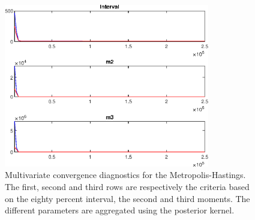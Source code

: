  
\begin{figure}[H]
\centering 
\includegraphics[width=0.8\textwidth]{BRS_growth_ext_fd_v1/Output/BRS_growth_ext_fd_v1_mdiag}
\caption{Multivariate convergence diagnostics for the Metropolis-Hastings.
The first, second and third rows are respectively the criteria based on
the eighty percent interval, the second and third moments. The different 
parameters are aggregated using the posterior kernel.}\label{Fig:MultivariateDiagnostics}
\end{figure}

